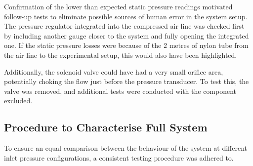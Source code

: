 Confirmation of the lower than expected static pressure readings motivated follow-up tests to eliminate possible sources of human error in the system setup. The pressure regulator integrated into the compressed air line was checked first by including another gauge closer to the system and fully opening the integrated one. If the static pressure losses were because of the 2 metres of nylon tube from the air line to the experimental setup, this would also have been highlighted.

Additionally, the solenoid valve could have had a very small orifice area, potentially choking the flow just before the pressure transducer. To test this, the valve was removed, and additional tests were conducted with the component excluded.

\subsection{Procedure to Characterise Full System}
To ensure an equal comparison between the behaviour of the system at different inlet pressure configurations, a consistent testing procedure was adhered to.


